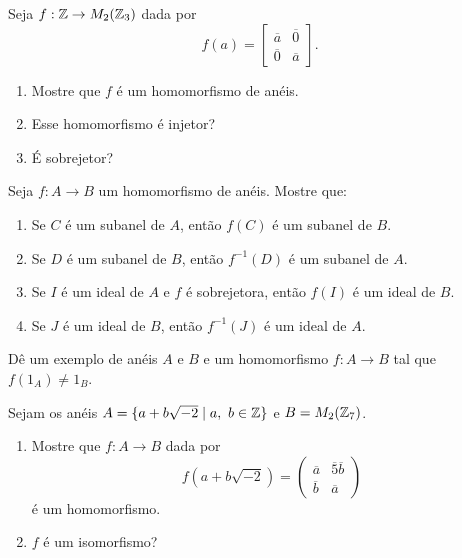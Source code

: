 \documentclass[12pt]{exam}
\begin{document}
    \vspace{.3cm}

    \questao{} Seja $f : \mathbb{Z} \to M_2(\mathbb{Z}_3)$ dada por
    \[
        f(a) = \begin{bmatrix}
            \overline{a} & \overline{0}\\
            \overline{0} & \overline{a}
        \end{bmatrix}.
    \]
    \begin{enumerate}[label=({\alph*})]
        \item Mostre que $f$ é um homomorfismo de anéis.

        \item Esse homomorfismo é injetor?

        \item É sobrejetor?
    \end{enumerate}

    \vspace{.3cm}

    \questao{} Seja $f: A \to B$ um homomorfismo de anéis. Mostre que:
    \begin{enumerate}[label=({\alph*})]
        \item Se $C$  é um subanel de $A$, então $f(C)$ é um subanel de $B$.

        \item Se $D$ é um subanel de $B$, então $f^{-1}(D)$ é um subanel de $A$.

        \item Se $I$ é um ideal de $A$ e $f$ é sobrejetora, então $f(I)$ é um ideal de $B$.

        \item Se $J$ é um ideal de $B$, então $f^{-1}(J)$ é um ideal de $A$.
    \end{enumerate}

    \vspace{.3cm}

    \questao{} Dê um exemplo de anéis $A$ e $B$ e um homomorfismo $f : A \to B$ tal que $f(1_A) \ne 1_B$.

    \vspace{.3cm}

    \questao{} Sejam os anéis $A = \{ a + b\sqrt{-2} \mid a,\ b \in \mathbb{Z}\}$ e $B = M_2(\mathbb{Z}_7)$.
    \begin{enumerate}[label=({\alph*})]
        \item Mostre que $f : A \to B$ dada por
        \[
        f(a + b\sqrt{-2}) =
        \begin{pmatrix}
        \overline{a} & \overline{5}\overline{b}\\
        \overline{b} & \overline{a}
        \end{pmatrix}
        \]
        é um homomorfismo.

        \item $f$ é um isomorfismo?
    \end{enumerate}
\end{document}
